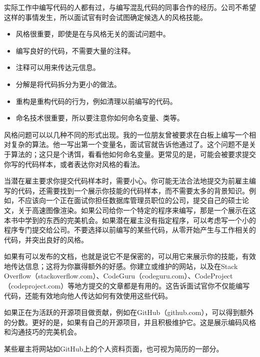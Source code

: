 
实际工作中编写代码的人都有过，与编写混乱代码的同事合作的经历。公司不希望这样的事情发生，所以面试官有时会试图确定候选人的风格技能。


\begin{itemize}
\item
风格很重要，即使是在与风格无关的面试问题中。

\item
编写良好的代码，不需要大量的注释。

\item
注释可以用来传达元信息。

\item
分解是将代码拆分为更小的做法。

\item
重构是重构代码的行为，例如清理以前编写的代码。

\item
命名技术很重要，所以要注意你如何命名变量、类等。
\end{itemize}


风格问题可以以几种不同的形式出现。我的一位朋友曾被要求在白板上编写一个相对复杂的算法。他一写出第一个变量名，面试官就告诉他通过了。这个问题不是关于算法的；这只是个诱饵，看看他如何命名变量。更常见的是，可能会被要求提交你写的代码样本，或者表达你对风格的看法。

当潜在雇主要求你提交代码样本时，需要小心。你可能无法合法地提交为前雇主编写的代码，还需要找到一个展示你技能的代码样本，而不需要太多的背景知识。例如，不应该向一个正在面试你担任数据库管理员职位的公司，提交自己的硕士论文，关于高速图像渲染。如果公司给你一个特定的程序来编写，那是一个展示在这本书中学到的东西的完美机会。如果潜在雇主没有指定程序，可以考虑写一个小的程序专门提交给公司。不要选择以前编写的某些代码，从零开始产生与工作相关的代码，并突出良好的风格。

如果有可以发布的文档，也就是说它不是保密的，可以用它来展示你的技能，有效地传达信息；这将为你赢得额外的好感。你建立或维护的网站，以及在Stack Overflow（stackoverflow.com）、CodeGuru（codeguru.com）、CodeProject（codeproject.com）等地方提交的文章都是有用的。这告诉面试官你不仅能编写代码，还能有效地向他人传达如何有效使用这些代码。

如果正在为活跃的开源项目做贡献，例如在GitHub（github.com），可以得到额外的分数。更好的是，如果有自己的开源项目，并且积极维护它。这是展示编码风格和沟通技巧的完美机会。

某些雇主将网站如GitHub上的个人资料页面，也可视为简历的一部分。













